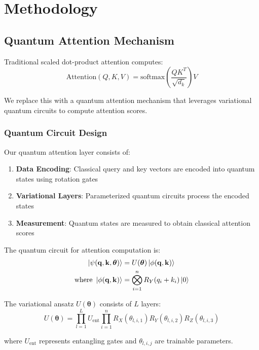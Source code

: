 \documentclass[11pt,twocolumn]{article}
\begin{document}
\section{Methodology}

\subsection{Quantum Attention Mechanism}

Traditional scaled dot-product attention computes:
\begin{equation}
\text{Attention}(Q, K, V) = \text{softmax}\left(\frac{QK^T}{\sqrt{d_k}}\right)V
\end{equation}

We replace this with a quantum attention mechanism that leverages variational quantum circuits to compute attention scores.

\subsubsection{Quantum Circuit Design}

Our quantum attention layer consists of:
\begin{enumerate}
    \item \textbf{Data Encoding}: Classical query and key vectors are encoded into quantum states using rotation gates
    \item \textbf{Variational Layers}: Parameterized quantum circuits process the encoded states
    \item \textbf{Measurement}: Quantum states are measured to obtain classical attention scores
\end{enumerate}

The quantum circuit for attention computation is:
\begin{align}
\ket{\psi(\mathbf{q}, \mathbf{k}, \boldsymbol{\theta})} &= U(\boldsymbol{\theta}) \ket{\phi(\mathbf{q}, \mathbf{k})}\\
\text{where } \ket{\phi(\mathbf{q}, \mathbf{k})} &= \bigotimes_{i=1}^{n} R_Y(q_i + k_i) \ket{0}
\end{align}

The variational ansatz $U(\boldsymbol{\theta})$ consists of $L$ layers:
\begin{equation}
U(\boldsymbol{\theta}) = \prod_{l=1}^{L} U_{\text{ent}} \prod_{i=1}^{n} R_X(\theta_{l,i,1}) R_Y(\theta_{l,i,2}) R_Z(\theta_{l,i,3})
\end{equation}

where $U_{\text{ent}}$ represents entangling gates and $\theta_{l,i,j}$ are trainable parameters.
\end{document}
